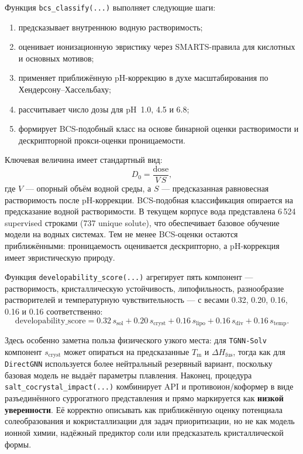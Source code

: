 \documentclass[11pt]{article}
\begin{document}
Функция \texttt{bcs\_classify(...)} выполняет следующие шаги:
\begin{enumerate}
  \item предсказывает внутреннюю водную растворимость;
  \item оценивает ионизационную эвристику через SMARTS-правила для кислотных и основных мотивов;
  \item применяет приближённую pH-коррекцию в духе масштабирования по Хендерсону--Хассельбаху;
  \item рассчитывает число дозы для pH~1.0, 4.5 и 6.8;
  \item формирует BCS-подобный класс на основе бинарной оценки растворимости и дескрипторной прокси-оценки проницаемости.
\end{enumerate}

Ключевая величина имеет стандартный вид:
\begin{equation*}
D_0 = \frac{\text{dose}}{V\,S},
\end{equation*}
где \(V\) --- опорный объём водной среды, а \(S\) --- предсказанная равновесная растворимость после pH-коррекции. BCS-подобная классификация опирается на предсказание водной растворимости. В текущем корпусе вода представлена 6\,524 supervised строками (737 unique solute), что обеспечивает базовое обучение модели на водных системах. Тем не менее BCS-оценки остаются приближёнными: проницаемость оценивается дескрипторно, а pH-коррекция имеет эвристическую природу.

Функция \texttt{developability\_score(...)} агрегирует пять компонент --- растворимость, кристаллическую устойчивость, липофильность, разнообразие растворителей и температурную чувствительность --- с весами 0.32, 0.20, 0.16, 0.16 и 0.16 соответственно:
\begin{equation*}
\text{developability\_score} = 0.32\,s_{\mathrm{sol}} + 0.20\,s_{\mathrm{cryst}} + 0.16\,s_{\mathrm{lipo}} + 0.16\,s_{\mathrm{div}} + 0.16\,s_{\mathrm{temp}}.
\end{equation*}

Здесь особенно заметна польза физического узкого места: для \texttt{TGNN-Solv} компонент \(s_{\mathrm{cryst}}\) может опираться на предсказанные \(T_{\mathrm{m}}\) и \(\Delta H_{\mathrm{fus}}\), тогда как для \texttt{DirectGNN} используется более нейтральный резервный вариант, поскольку базовая модель не выдаёт параметры плавления. Наконец, процедура \texttt{salt\_cocrystal\_impact(...)} комбинирует API и противоион/коформер в виде разъединённого суррогатного представления и прямо маркируется как \textbf{низкой уверенности}. Её корректно описывать как приближённую оценку потенциала солеобразования и кокристаллизации для задач приоритизации, но не как модель ионной химии, надёжный предиктор соли или предсказатель кристаллической формы.
\end{document}
